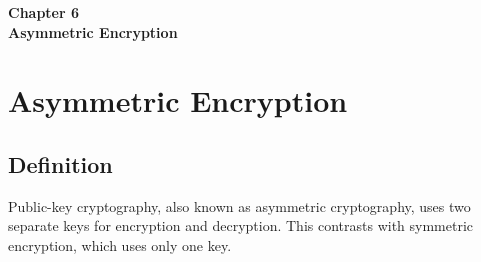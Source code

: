 \clearpage
\thispagestyle{empty} 
\begin{center}
    \vspace*{\fill} 
    \Huge \textbf{Chapter 6} \\
    \Huge \textbf{Asymmetric Encryption} 
    \vspace*{\fill}
\end{center}
\clearpage
\chapter{Asymmetric Encryption}

\section{Definition}
Public-key cryptography, also known as asymmetric cryptography, uses two separate keys for encryption and decryption. This contrasts with symmetric encryption, which uses only one key.

